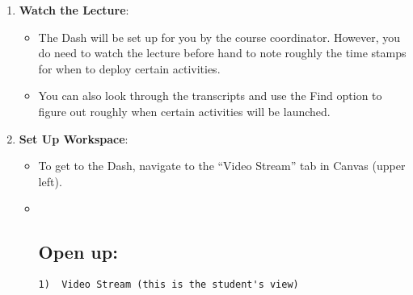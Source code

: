 \documentclass[
]{article}
\providecommand{\tightlist}{%
  \setlength{\itemsep}{0pt}\setlength{\parskip}{0pt}}
\begin{document}
\begin{enumerate}
\def\labelenumi{\arabic{enumi}.}
\tightlist
\item
  \textbf{Watch the Lecture}:

  \begin{itemize}
  \tightlist
  \item
    The Dash will be set up for you by the course coordinator. However, you do need to watch the lecture before hand to note roughly the time stamps for when to deploy certain activities.
  \item
    You can also look through the transcripts and use the Find option to figure out roughly when certain activities will be launched.
  \end{itemize}
\item
  \textbf{Set Up Workspace}:

  \begin{itemize}
  \item
    To get to the Dash, navigate to the ``Video Stream'' tab in Canvas (upper left).
  \item ~
    \hypertarget{open-up}{%
    \subsection{Open up:}\label{open-up}}

\begin{verbatim}
1)  Video Stream (this is the student's view)
\end{verbatim}


\end{itemize}
\end{enumerate}
\end{document}
